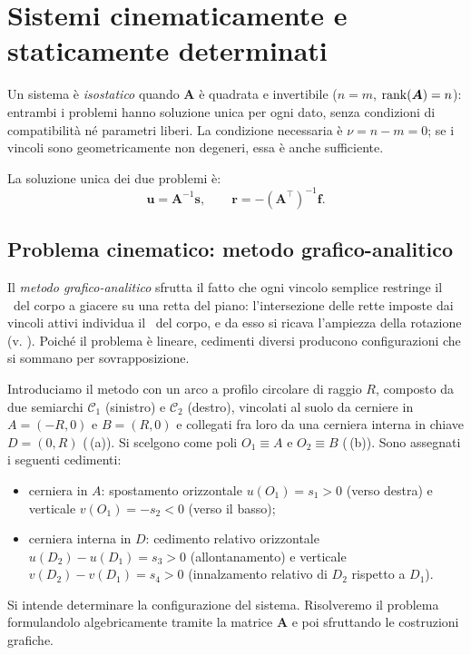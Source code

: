 
\section{Sistemi cinematicamente e staticamente determinati}
\label{sec:determinato}

Un sistema è \emph{isostatico} quando $\bm{A}$ è quadrata e
invertibile ($n = m$, $\operatorname{rank}(\bm{A}) = n$): entrambi i problemi
hanno soluzione unica per ogni dato, senza condizioni di
compatibilità né parametri liberi. La condizione necessaria è
$\nu = n - m = 0$; se i vincoli sono geometricamente non
degeneri, essa è anche sufficiente.

La soluzione unica dei due problemi è:
\begin{equation}
	\bm{u} = \bm{A}^{-1}\bm{s},
	\qquad
	\bm{r} = -(\bm{A}^{\top})^{-1}\bm{f}.
\end{equation}


\subsection{Problema cinematico: metodo grafico-analitico}
\label{sec:grafo_analitico}

Il \emph{metodo grafico-analitico} sfrutta il fatto che ogni
vincolo semplice restringe il \CRa\ del corpo a giacere su una retta
del piano:
l'intersezione delle rette imposte dai vincoli attivi
individua il \CRa\ del corpo, e da esso si ricava l'ampiezza
della rotazione (v. ). Poiché il problema è lineare, cedimenti
diversi producono configurazioni che si sommano per
sovrapposizione.

Introduciamo il metodo con un arco a profilo circolare di raggio $R$,
composto da due semiarchi $\mathcal{C}_1$ (sinistro) e
$\mathcal{C}_2$ (destro), vincolati al suolo da cerniere
in $A = (-R, 0)$ e $B = (R, 0)$ e collegati fra loro da
una cerniera interna in chiave $D = (0, R)$ (\,(a)). Si scelgono
come poli $O_1 \equiv A$ e $O_2 \equiv B$ (\,(b)). Sono assegnati
i seguenti cedimenti:
\begin{itemize}[noitemsep]
	\item cerniera in $A$: spostamento orizzontale
	$u(O_1) = s_1 > 0$ (verso destra) e verticale
	$v(O_1) = -s_2 < 0$ (verso il basso);
	\item cerniera interna in $D$: cedimento relativo
	orizzontale $u(D_2) - u(D_1) = s_3 > 0$
	(allontanamento) e verticale
	$v(D_2) - v(D_1) = s_4 > 0$ (innalzamento relativo
	di $D_2$ rispetto a $D_1$).
\end{itemize}
Si intende determinare la configurazione del sistema. Risolveremo  il problema formulandolo algebricamente tramite la matrice $\bm{A}$ e poi sfruttando 
le costruzioni grafiche.

